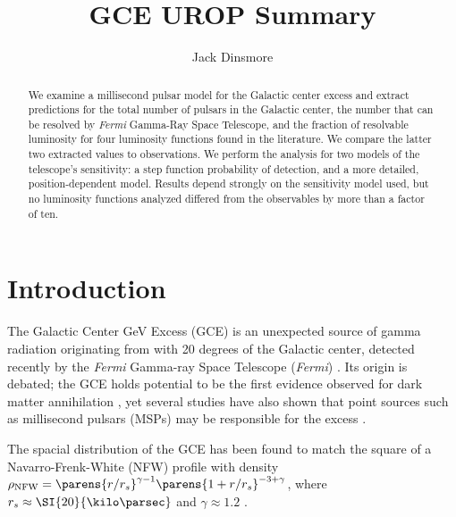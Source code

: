 \documentclass{C://Aliases//Dropbox-MIT//Latex_Templates//personal}
\author{Jack Dinsmore}
\title{GCE UROP Summary}
\begin{document}
\maketitle

\begin{abstract}
We examine a millisecond pulsar model for the Galactic center excess and extract predictions for the total number of pulsars in the Galactic center, the number that can be resolved by \textit{Fermi} Gamma-Ray Space Telescope, and the fraction of resolvable luminosity for four luminosity functions found in the literature. We compare the latter two extracted values to observations. We perform the analysis for two models of the telescope's sensitivity: a step function probability of detection, and a more detailed, position-dependent model. Results depend strongly on the sensitivity model used, but no luminosity functions analyzed differed from the observables by more than a factor of ten.
\end{abstract}


\section{Introduction}
The Galactic Center GeV Excess (GCE) is an unexpected source of gamma radiation originating from with 20 degrees of the Galactic center, detected recently by the \textit{Fermi} Gamma-ray Space Telescope (\textit{Fermi}) \cite{Goodenough:2009gk, Eckner:2017oul}. Its origin is debated; the GCE holds potential to be the first evidence observed for dark matter annihilation \cite{Abazajian:2012pn,}, yet several studies have also shown that point sources such as millisecond pulsars (MSPs) may be responsible for the excess \cite{Wang:2005, Yuan:2014yda}.

The spacial distribution of the GCE has been found to match the square of a  Navarro-Frenk-White (NFW) profile with density $\rho_{\text{NFW}} = \parens{r / r_s}^{\gamma-1}\parens{1 + r/r_s}^{-3+\gamma}$, where $r_s \approx \SI{20}{\kilo\parsec}$ and $\gamma \approx 1.2$ \cite{Goodenough:2009gk, Zhong:2019ycb}. 
\end{document}
